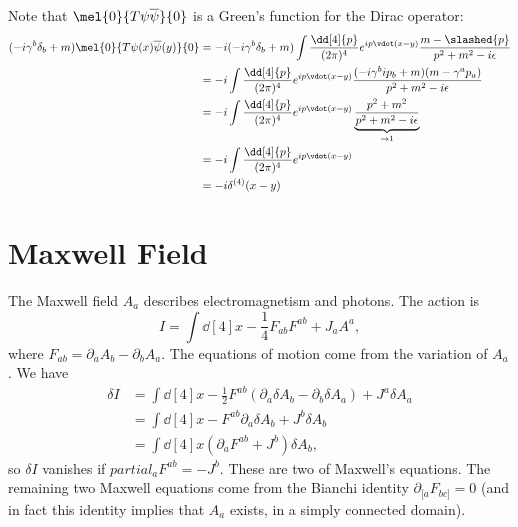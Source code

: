\documentclass{jknotes} %
\begin{document}
Note that \(\mel{0}{T\psi\overline{\psi}}{0}\) is a Green's function for the Dirac operator:
\begin{align}
    (-i\gamma^b\delta_b+m)\mel{0}{T\psi(x)\overline{\psi}(y)}{0} &= -i(-i\gamma^b\delta_b+m)\int\frac{\dd[4]{p}}{(2\pi)^4}e^{ip\vdot(x-y)}\frac{m-\slashed{p}}{p^2+m^2-i\epsilon} 
    \\
    &= -i\int\frac{\dd[4]{p}}{(2\pi)^4}e^{ip\vdot(x-y)} \frac{(-i\gamma^bip_b+m)(m-\gamma^ap_a)}{p^2+m^2-i\epsilon} \\
    &= -i\int\frac{\dd[4]{p}}{(2\pi)^4}e^{ip\vdot(x-y)} \underbrace{\frac{p^2+m^2}{p^2+m^2-i\epsilon}}_{\to 1} \\
    &= -i\int\frac{\dd[4]{p}}{(2\pi)^4}e^{ip\vdot(x-y)} \\
    &= -i\delta^{(4)}(x-y)
\end{align}

\section{Maxwell Field}
The Maxwell field \(A_a\) describes electromagnetism and photons. The action is
\begin{equation}
    I = \int\dd[4]{x} -\frac{1}{4}F_{ab}F^{ab} + J_a A^a,
\end{equation}
where \(F_{ab} = \partial_a A_b - \partial_b A_a\). The equations of motion come from the variation of \(A_a\). We have
\begin{align}
    \delta I &= \int\dd[4]{x} -\frac{1}{2}F^{ab}(\partial_a\delta A_b - \partial_b \delta A_a) + J^a \delta A_a \\
             &= \int\dd[4]{x} -F^{ab}\partial_a\delta A_b + J^b\delta A_b \\
             &= \int\dd[4]{x} (\partial_a F^{ab}+J^b)\delta A_b,
\end{align}
so \(\delta I\) vanishes if \(partial_a F^{ab}=-J^b\). These are two of Maxwell's equations. The remaining two Maxwell equations come from the Bianchi identity \(\partial_{[a}F_{bc]}=0\) (and in fact this identity implies that \(A_a\) exists, in a simply connected domain).
\end{document}
